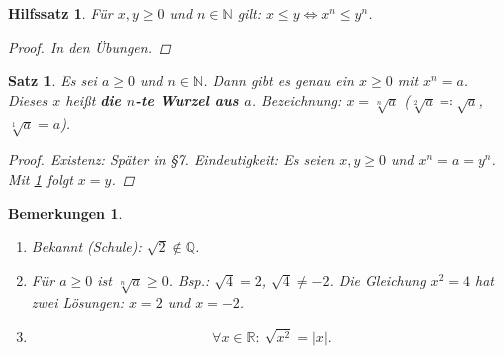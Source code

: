 \documentclass[12pt]{extreport} %
\newcommand{\N}{\mathbb{N}}
\newcommand{\Q}{\mathbb{Q}}
\newcommand{\R}{\mathbb{R}}
\theoremstyle{named}
\theoremstyle{itshape}
\newtheorem{satz}[unnamedtheorem]{Satz}
\newtheorem{hilfssatz}[unnamedtheorem]{Hilfssatz}
\theoremstyle{normal}
\newtheorem*{bemerkungen}{Bemerkungen}
\begin{document}
\begin{hilfssatz} \label{HS1}
	Für $x, y \geq 0$ und $n \in \N$ gilt: $x \leq y \iff x^{n} \leq y^{n}$.

	\begin{proof}
		In den Übungen.
	\end{proof}
\end{hilfssatz}

\begin{satz} \label{1.6:satz}
	Es sei $a \geq 0$ und $n \in \N$. Dann gibt es genau ein $x \geq 0$ mit $x^{n} = a$. \\
	Dieses $x$ hei{\ss}t \textbf{die $n$-te Wurzel aus $a$}. Bezeichnung: $x = \sqrt[n]{a}$ ($\sqrt[2]{a} \eqqcolon \sqrt{a}$, $\sqrt[1]{a} = a$).
	
	\begin{proof}
		Existenz: Später in \S 7. Eindeutigkeit: Es seien $x, y \geq 0$ und $x^{n} = a = y^{n}$. Mit \ref{HS1} folgt $x = y$.
	\end{proof}
\end{satz}


\begin{bemerkungen} \
	\begin{enumerate}
		\item Bekannt (Schule): $\sqrt{2} \notin \Q$.
		\item Für $a \geq 0$ ist $\sqrt[n]{a} \geq 0$. Bsp.: $\sqrt{4} = 2$, $\sqrt{4} \neq - 2$. Die Gleichung $x^{2} = 4$ hat zwei Lösungen: $x = 2$ und $x=-2$.
		\item $$\forall x \in \R: ~ \sqrt{x^{2}} = |x|.$$
	\end{enumerate}
\end{bemerkungen}
\end{document}
